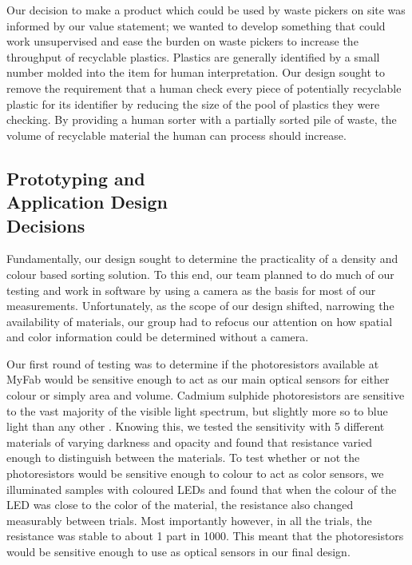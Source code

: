 \documentclass[12pt]{article}
\begin{document}
\begin{multicols*}{2}
            Our decision to make a product which could be used by waste pickers on site was informed by our value statement; we wanted to develop something that could work unsupervised and ease the burden on waste pickers to increase the throughput of recyclable plastics. Plastics are generally identified by a small number molded into the item \cite{plasticactioncenter_2022} for human interpretation. Our design sought to remove the requirement that a human check every piece of potentially recyclable plastic for its identifier by reducing the size of the pool of plastics they were checking. By providing a human sorter with a partially sorted pile of waste, the volume of recyclable material the human can process should increase.  

        \subsection{Prototyping and \\ Application Design \\ Decisions}
            Fundamentally, our design sought to determine the practicality of a density and colour based sorting solution. To this end, our team planned to do much of our testing and work in software by using a camera as the basis for most of our measurements. Unfortunately, as the scope of our design shifted, narrowing the availability of materials, our group had to refocus our attention on how spatial and color information could be determined without a camera.

            Our first round of testing was to determine if the photoresistors available at MyFab would be sensitive enough to act as our main optical sensors for either colour or simply area and volume. Cadmium sulphide photoresistors are sensitive to the vast majority of the visible light spectrum, but slightly more so to blue light than any other \cite{eepower_2017}. Knowing this, we tested the sensitivity with 5 different materials of varying darkness and opacity and found that resistance varied enough to distinguish between the materials. To test whether or not the photoresistors would be sensitive enough to colour to act as color sensors, we illuminated samples with coloured LEDs and found that when the colour of the LED was close to the color of the material, the resistance also changed measurably between trials. Most importantly however, in all the trials, the resistance was stable to about 1 part in 1000. This meant that the photoresistors would be sensitive enough to use as optical sensors in our final design.
            

\end{multicols*}
\end{document}
